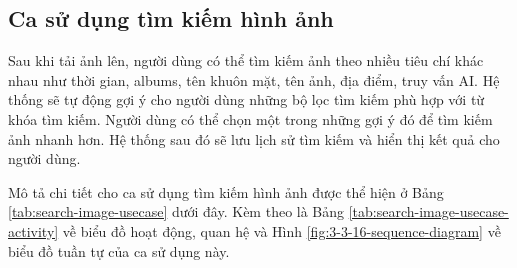 \subsection{Ca sử dụng tìm kiếm hình ảnh}

Sau khi tải ảnh lên, người dùng có thể tìm kiếm ảnh theo nhiều tiêu chí khác nhau như thời gian, albums, tên khuôn mặt, tên ảnh, địa điểm, truy vấn AI. Hệ thống sẽ tự động gợi ý cho người dùng những bộ lọc tìm kiếm phù hợp với từ khóa tìm kiếm. Người dùng có thể chọn một trong những gợi ý đó để tìm kiếm ảnh nhanh hơn. Hệ thống sau đó sẽ lưu lịch sử tìm kiếm và hiển thị kết quả cho người dùng. 

Mô tả chi tiết cho ca sử dụng tìm kiếm hình ảnh được thể hiện ở Bảng \ref{tab:search-image-usecase} dưới đây. Kèm theo là Bảng \ref{tab:search-image-usecase-activity} về biểu đồ hoạt động, quan hệ và Hình \ref{fig:3-3-16-sequence-diagram} về biểu đồ tuần tự của ca sử dụng này. 


